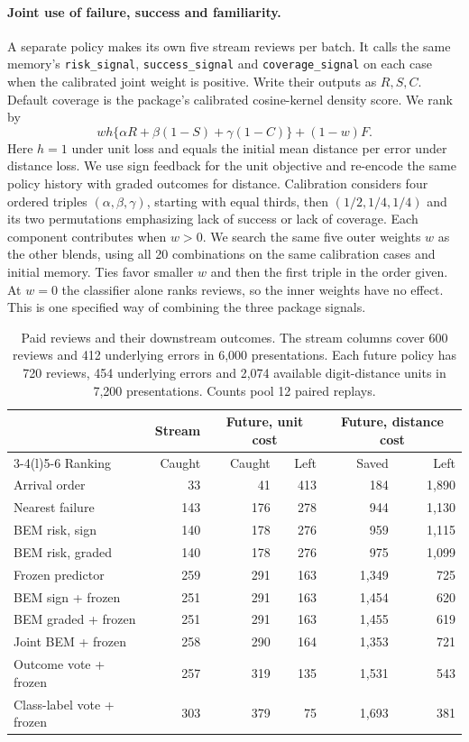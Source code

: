 \paragraph{Joint use of failure, success and familiarity.}
A separate policy makes its own five stream reviews per batch. It calls the
same memory's \texttt{risk\_signal}, \texttt{success\_signal} and
\texttt{coverage\_signal} on each case when the calibrated joint weight is
positive. Write their outputs as $R,S,C$. Default coverage is the
package's calibrated cosine-kernel density score. We rank by
\[
  w h \{\alpha R+\beta(1-S)+\gamma(1-C)\}+(1-w)F .
\]
Here $h=1$ under unit loss and equals the initial mean distance per error
under distance loss. We use sign feedback for the unit objective and
re-encode the same policy history with graded outcomes for distance.
Calibration considers four ordered triples $(\alpha,\beta,\gamma)$, starting with
equal thirds, then $(1/2,1/4,1/4)$ and its two permutations emphasizing
lack of success or lack of coverage. Each component contributes when $w>0$.
We search the same five outer weights $w$ as the other blends, using all
20 combinations on the same calibration cases and initial memory. Ties
favor smaller $w$ and then the first triple in the order given. At $w=0$
the classifier alone ranks reviews, so the inner weights have no effect.
This is one specified way of combining the three package signals.

\begin{table}[htbp]
\centering
\caption{Paid reviews and their downstream outcomes. The stream columns cover
600 reviews and 412 underlying errors in 6,000 presentations. Each future
policy has 720 reviews, 454 underlying errors and 2,074 available
digit-distance units in 7,200 presentations. Counts pool 12 paired replays.}
\label{tab:digit-budget}
\small
\begin{tabular}{@{}lrrrrr@{}}
\toprule
 & Stream & \multicolumn{2}{c}{Future, unit cost} &
   \multicolumn{2}{c}{Future, distance cost} \\
\cmidrule(lr){3-4}\cmidrule(l){5-6}
Ranking & Caught & Caught & Left & Saved & Left \\
\midrule
Arrival order             &  33 &  41 & 413 &  184 & 1,890 \\
Nearest failure           & 143 & 176 & 278 &  944 & 1,130 \\
BEM risk, sign            & 140 & 178 & 276 &  959 & 1,115 \\
BEM risk, graded          & 140 & 178 & 276 &  975 & 1,099 \\
Frozen predictor          & 259 & 291 & 163 & 1,349 & 725 \\
BEM sign + frozen         & 251 & 291 & 163 & 1,454 & 620 \\
BEM graded + frozen       & 251 & 291 & 163 & 1,455 & 619 \\
Joint BEM + frozen        & 258 & 290 & 164 & 1,353 & 721 \\
Outcome vote + frozen     & 257 & 319 & 135 & 1,531 & 543 \\
Class-label vote + frozen & 303 & 379 &  75 & 1,693 & 381 \\
\bottomrule
\end{tabular}
\end{table}

